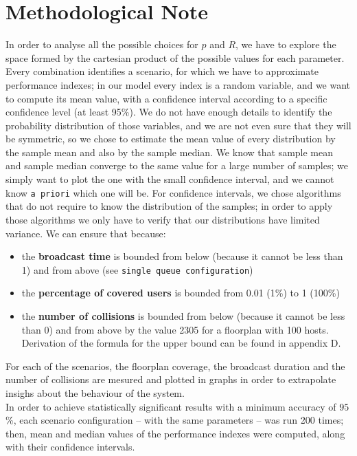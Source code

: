 \section*{Methodological Note}\label{Methodological}
In order to analyse all the possible choices for $p$ and $R$, we have to explore the space
formed by the cartesian product of the possible values for each parameter. Every combination 
identifies a scenario, for which we have to approximate performance indexes; in our model
every index is a random variable, and we want to compute its mean value, with a confidence interval
according to a specific confidence level (at least 95\%). 
We do not have enough details to identify the probability distribution of those variables, and 
we are not even sure that they will be symmetric, so we chose to estimate the mean value of every 
distribution by the sample mean and also by the sample median.
We know that sample mean and sample median converge to the same value for a large number
of samples; we simply want to plot the one with the small confidence interval, and we cannot know
\texttt{a priori} which one will be.
For confidence intervals, we chose algorithms that do not require to know the distribution of the
samples; in order to apply those algorithms we only have to verify that our distributions have
limited variance. We can ensure that because:
\begin{itemize}
    \item the \textbf{broadcast time} is bounded from below (because it cannot be less than 1) and from above
        (see \texttt{single queue configuration})
    \item the \textbf{percentage of covered users} is bounded from 0.01 (1\%) to 1 (100\%)
    \item the \textbf{number of collisions} is bounded from below (because it cannot be less than 0) and
        from above by the value 2305 for a floorplan with 100 hosts. Derivation of the formula for the upper bound can be found in appendix D.
\end{itemize} 

For each of the scenarios, the floorplan coverage, the
broadcast duration and the number of collisions are mesured and plotted in graphs in order to 
extrapolate insighs about the behaviour of the system.\\
In order to achieve statistically significant results with a minimum accuracy of
$95$\%, each scenario configuration -- with the same parameters -- was run 200 times; then, mean and median values of the performance
indexes were computed, along with their confidence intervals.
